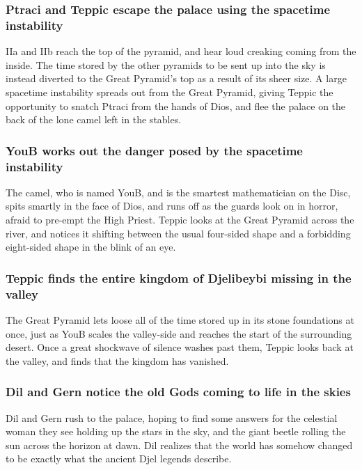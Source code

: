 \subsubsection{\Gls{Ptraci} and \Gls{Teppic} escape the palace using the spacetime instability}
\Gls{IIa} and \Gls{IIb} reach the top of the pyramid, and hear loud creaking coming from the inside.
The time stored by the other pyramids to be sent up into the sky is instead diverted to the Great
Pyramid's top as a result of its sheer size. A large spacetime instability spreads out from the
Great Pyramid, giving \Gls{Teppic} the opportunity to snatch \Gls{Ptraci} from the hands of
\Gls{Dios}, and flee the palace on the back of the lone camel left in the stables.

\subsubsection{\Gls{YouB} works out the danger posed by the spacetime instability}
The camel, who is named \Gls{YouB}, and is the smartest mathematician on the Disc, spits smartly
in the face of \Gls{Dios}, and runs off as the guards look on in horror, afraid to pre-empt the
High Priest. \Gls{Teppic} looks at the Great Pyramid across the river, and notices it shifting
between the usual four-sided shape and a forbidding eight-sided shape in the blink of an eye.

\subsubsection{\Gls{Teppic} finds the entire kingdom of Djelibeybi missing in the valley}
The Great Pyramid lets loose all of the time stored up in its stone foundations at once, just as
\Gls{YouB} scales the valley-side and reaches the start of the surrounding desert. Once a great
shockwave of silence washes past them, \Gls{Teppic} looks back at the valley, and finds that the
kingdom has vanished.

\subsubsection{\Gls{Dil} and \Gls{Gern} notice the old Gods coming to life in the skies}
\Gls{Dil} and \Gls{Gern} rush to the palace, hoping to find some answers for the celestial woman
they see holding up the stars in the sky, and the giant beetle rolling the sun across the horizon
at dawn. \Gls{Dil} realizes that the world has somehow changed to be exactly what the ancient Djel
legends describe.


